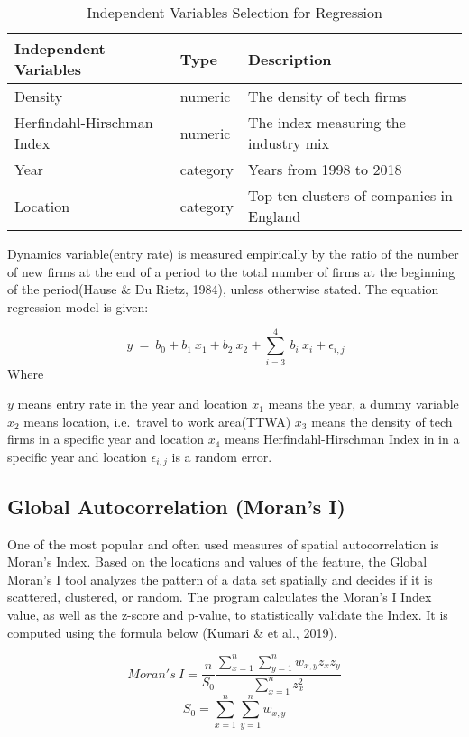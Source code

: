 \documentclass[
  12pt,
  oneside]{book}
\begin{document}
\begin{table}

\caption{\label{tab:tab-reg-idp-var}Independent Variables Selection for Regression}
\centering
\begin{tabular}[t]{lll}
\toprule
\textbf{Independent Variables} & \textbf{Type} & \textbf{Description}\\
\midrule
Density & numeric & The density of tech firms\\
Herfindahl-Hirschman Index & numeric & The index measuring the industry mix\\
Year & category & Years from 1998 to 2018\\
Location & category & Top ten clusters of companies in England\\
\bottomrule
\end{tabular}
\end{table}

Dynamics variable(entry rate) is measured empirically by the ratio of the number of new firms at the end of a period to the total number of firms at the beginning of the period(Hause \& Du Rietz, 1984), unless otherwise stated. The equation regression model is given:

\[
\ y\ =\ b_0 + b_1 \ x_1 + b_2 \ x_2 + \sum_{i=3}^{4} \ b_i \ x_i + \epsilon_{i,j}
\]
Where

\(y\) means entry rate in the year and location
\(x_1\) means the year, a dummy variable
\(x_2\) means location, i.e.~travel to work area(TTWA)
\(x_3\) means the density of tech firms in a specific year and location
\(x_4\) means Herfindahl-Hirschman Index in in a specific year and location
\(\epsilon_{i,j}\) is a random error.

\hypertarget{global-autocorrelation-morans-i}{%
\subsection{Global Autocorrelation (Moran's I)}\label{global-autocorrelation-morans-i}}

One of the most popular and often used measures of spatial autocorrelation is Moran's Index. Based on the locations and values of the feature, the Global Moran's I tool analyzes the pattern of a data set spatially and decides if it is scattered, clustered, or random. The program calculates the Moran's I Index value, as well as the z-score and p-value, to statistically validate the Index. It is computed using the formula below (Kumari \& et al., 2019).

\[
Moran's \ I = \frac{n}{S_0} \frac{\sum_{x=1}^n \sum_{y=1}^n w_{x,y} z_x z_y}{\sum_{x=1}^n z_x^2}
\]
\[
S_0 = \sum_{x=1}^n \sum_{y=1}^n w_{x,y}
\]
\end{document}
